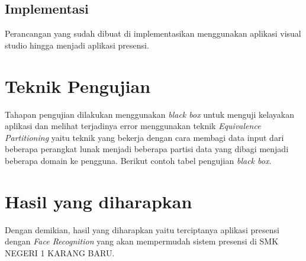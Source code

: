 \subsection{Implementasi}
Perancangan yang sudah dibuat  di implementasikan menggunakan aplikasi visual studio hingga menjadi aplikasi presensi.

\section{Teknik Pengujian}
Tahapan pengujian dilakukan menggunakan \emph{black box} untuk menguji kelayakan aplikasi dan melihat terjadinya error menggunakan teknik \emph{Equivalence Partitioning} yaitu teknik yang bekerja dengan cara membagi data input dari beberapa perangkat lunak menjadi beberapa partisi data yang dibagi menjadi beberapa domain ke pengguna. Berikut contoh tabel pengujian \emph{black box}.


\section{Hasil yang diharapkan}
Dengan demikian, hasil yang diharapkan yaitu terciptanya aplikasi presensi dengan \emph{Face Recognition} yang akan mempermudah sistem presensi di SMK NEGERI 1 KARANG BARU.
